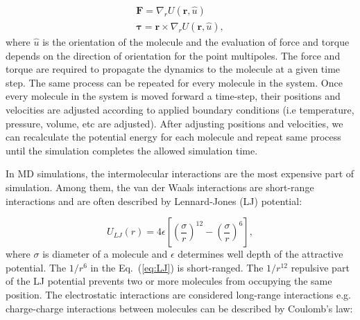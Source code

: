 \begin{subequations}
\begin{gather}
\mathbf F = \nabla_r U(\mathbf r, \hat{u}) \\
\mathbf {\mathbf{\tau}} = \mathbf r \times \nabla_r U(\mathbf r, \hat{u}),
\end{gather}
\label{eq:forceTorque}
\end{subequations}
where $\hat{u}$ is the orientation of the molecule and the evaluation of force and torque depends on the direction of orientation for the point multipoles. The force and torque are required to propagate the dynamics to the molecule at a given time step. The same process can be repeated for every molecule in the system. Once every molecule in the system is moved forward a time-step, their positions and velocities are adjusted according to applied boundary conditions (i.e temperature, pressure, volume, etc are adjusted). After adjusting positions and velocities, we can recalculate the potential energy for each molecule and repeat same process until the simulation completes the allowed simulation time.
 
In MD simulations, the intermolecular interactions are the most expensive part of simulation. Among them, the van der Waals interactions are short-range interactions and are often described by Lennard-Jones (LJ) potential:

\begin{equation}
U_{LJ}(r) = 4\epsilon \left[\left(\frac{\sigma}{r} \right)^{12} - \left(\frac{\sigma}{r} \right)^6\right],
\label{eq:LJ}
\end{equation}
where $\sigma$ is diameter of a molecule and $\epsilon$ determines well depth of the attractive potential. The $1/r^6$ in the Eq.~(\ref{eq:LJ}) is short-ranged. The $1/r^{12}$ repulsive part of the  LJ potential prevents two or more molecules from occupying the same position. The electrostatic interactions are considered long-range interactions e.g. charge-charge interactions between molecules can be described by Coulomb's law: 

